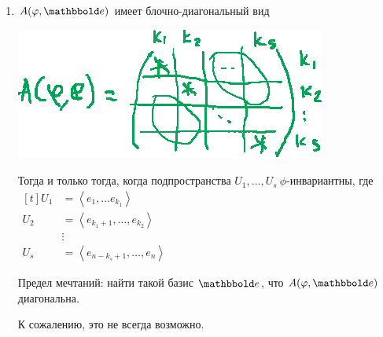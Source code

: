 \begin{enumerate}
    \item
        $A(\phi, \E)$ имеет блочно-диагональный вид
        \begin{center}
            \includegraphics{lecture27_drawing_7}
        \end{center}

        Тогда и только тогда, когда подпространства $U_1, \dots, U_s \ \phi$-инвариантны, где 
        \begin{math}
            \begin{aligned}[t]
                U_1 &= \left<e_1, \dots e_{k_1}\right> \\
                U_2 &= \left< e_{k_1 + 1}, \dots, e_{k_2} \right> \\
                    &\vdots \\
                U_s &= \left< e_{n - k_s + 1}, \dots, e_n \right>
            \end{aligned}
        \end{math}

        Предел мечтаний: найти такой базис $\E$, что $A(\phi, \E)$ диагональна.

        К сожалению, это не всегда возможно.
        \hspace{0.3cm}
\end{enumerate}
